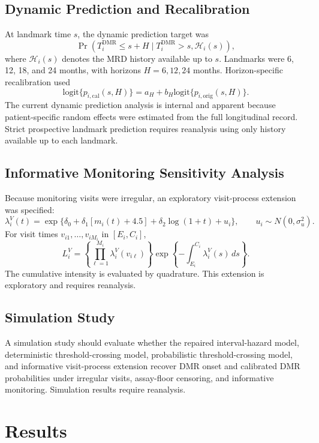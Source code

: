 \subsection{Dynamic Prediction and Recalibration}

At landmark time \(s\), the dynamic prediction target was
\[
\Pr(T_i^{\mathrm{DMR}}\le s+H\mid T_i^{\mathrm{DMR}}>s,\mathcal H_i(s)),
\]
where \(\mathcal H_i(s)\) denotes the MRD history available up to \(s\). Landmarks were 6, 12, 18, and 24 months, with horizons \(H=6,12,24\) months. Horizon-specific recalibration used
\[
\mathrm{logit}\{p_{i,\mathrm{cal}}(s,H)\}
=a_H+b_H\mathrm{logit}\{p_{i,\mathrm{orig}}(s,H)\}.
\]
The current dynamic prediction analysis is internal and apparent because patient-specific random effects were estimated from the full longitudinal record. Strict prospective landmark prediction requires reanalysis using only history available up to each landmark.

\subsection{Informative Monitoring Sensitivity Analysis}

Because monitoring visits were irregular, an exploratory visit-process extension was specified:
\[
\lambda_i^V(t)=
\exp\{\delta_0+\delta_1[m_i(t)+4.5]+\delta_2\log(1+t)+u_i\},
\qquad u_i\sim N(0,\sigma_u^2).
\]
For visit times \(v_{i1},\ldots,v_{iM_i}\) in \([E_i,C_i]\),
\[
L_i^V=
\left\{\prod_{\ell=1}^{M_i}\lambda_i^V(v_{i\ell})\right\}
\exp\left\{-\int_{E_i}^{C_i}\lambda_i^V(s)\,ds\right\}.
\]
The cumulative intensity is evaluated by quadrature. This extension is exploratory and requires reanalysis.

\subsection{Simulation Study}

A simulation study should evaluate whether the repaired interval-hazard model, deterministic threshold-crossing model, probabilistic threshold-crossing model, and informative visit-process extension recover DMR onset and calibrated DMR probabilities under irregular visits, assay-floor censoring, and informative monitoring. Simulation results require reanalysis.

\section{Results}

